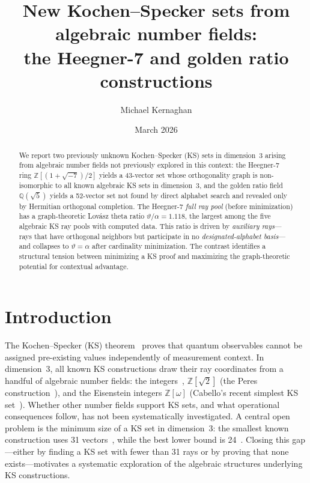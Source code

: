 \documentclass[twocolumn,prl,superscriptaddress,nofootinbib]{revtex4-2}
\newcommand{\Z}{\mathbb{Z}}
\newcommand{\Q}{\mathbb{Q}}
\begin{document}
\title{New Kochen--Specker sets from algebraic number fields:\\the Heegner-7 and golden ratio constructions}

\author{Michael Kernaghan}

\date{March 2026}

\begin{abstract}
We report two previously unknown Kochen--Specker (KS) sets in dimension~3 arising from algebraic number fields not previously explored in this context: the Heegner-7 ring $\Z[(1{+}\sqrt{-7})/2]$ yields a 43-vector set whose orthogonality graph is non-isomorphic to all known algebraic KS sets in dimension~3, and the golden ratio field $\Q(\sqrt{5})$ yields a 52-vector set not found by direct alphabet search and revealed only by Hermitian orthogonal completion. The Heegner-7 \emph{full ray pool} (before minimization) has a graph-theoretic Lov\'asz theta ratio $\vartheta/\alpha = 1.118$, the largest among the five algebraic KS ray pools with computed data. This ratio is driven by \emph{auxiliary rays}---rays that have orthogonal neighbors but participate in no \emph{designated-alphabet basis}---and collapses to $\vartheta = \alpha$ after cardinality minimization. The contrast identifies a structural tension between minimizing a KS proof and maximizing the graph-theoretic potential for contextual advantage.
\end{abstract}

\maketitle

\section{Introduction}

The Kochen--Specker (KS) theorem~\cite{KochenSpecker1967} proves that quantum observables cannot be assigned pre-existing values independently of measurement context. In dimension~3, all known KS constructions draw their ray coordinates from a handful of algebraic number fields: the integers~\cite{ConwayKochen}, $\Z[\sqrt{2}]$ (the Peres construction~\cite{Peres1991}), and the Eisenstein integers $\Z[\omega]$ (Cabello's recent simplest KS set~\cite{Cabello2025simplest}). Whether other number fields support KS sets, and what operational consequences follow, has not been systematically investigated. A central open problem is the minimum size of a KS set in dimension~3: the smallest known construction uses 31 vectors~\cite{ConwayKochen}, while the best lower bound is 24~\cite{LiBrightGanesh2024}. Closing this gap---either by finding a KS set with fewer than 31 rays or by proving that none exists---motivates a systematic exploration of the algebraic structures underlying KS constructions.
\end{document}

